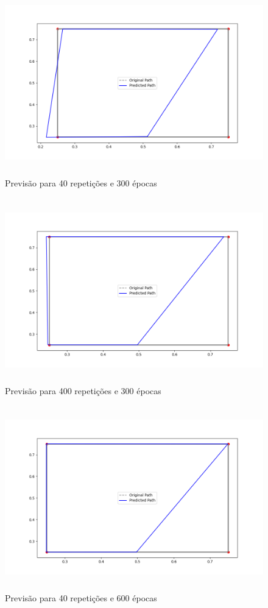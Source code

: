 \documentclass[12 pt]{article}
\begin{document}
\begin{enumerate}
    \begin{figure}[H]
        \caption{Previsão para 40 repetições e 300 épocas}
           \centering
           \includegraphics[height=8cm]{fig/Item_4_40_300.png}
    \end{figure}

    \begin{figure}[H]
        \caption{Previsão para 400 repetições e 300 épocas}
           \centering
           \includegraphics[height=8cm]{fig/Item_4_400_300.png}
    \end{figure}

    \begin{figure}[H]
        \caption{Previsão para 40 repetições e 600 épocas}
           \centering
           \includegraphics[height=8cm]{fig/Item_4_40_600.png}
    \end{figure}



\end{enumerate}
\end{document}
